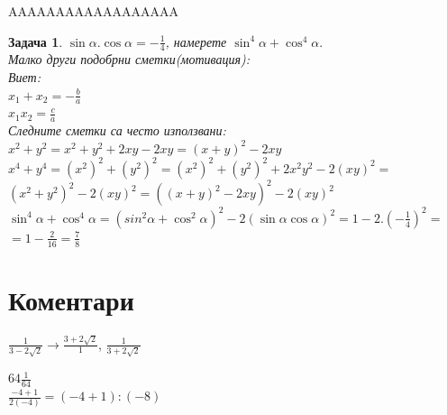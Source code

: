 \documentclass{article}
\newtheorem{problem}{Задача}
\begin{document}
AAAAAAAAAAAAAAAAAA \\

\begin{problem}
	$\sin \alpha . \cos \alpha = -\frac{1}{4}  $, намерете $\sin^4 \alpha + \cos^4 \alpha. $\\
	Малко други подобрни сметки(мотивация): \\
	Виет: \\
	$x_1 + x_2 = - \frac{b}{a} $\\
	$x_1 x_2 = \frac{c}{a} $\\
	Следните сметки са често използвани: \\
	$x^2 + y^2 = x^2 + y^2 +2xy - 2xy =  (x+y)^2 - 2xy $\\
	$x^4 + y^4 = (x^2)^2 +( y^2)^2 = (x^2)^2 +( y^2)^2 + 2x^2y^2 - 2(xy)^2 = $ \\
	$ (x^2 + y^2)^2 - 2(xy)^2  = ((x+y)^2 - 2xy)^2 - 2(xy)^2$ \\
	
	$\sin^4 \alpha + \cos^4 \alpha = (sin^2 \alpha + \cos^2 \alpha)^2 - 2(\sin \alpha \cos \alpha)^2 = 1 - 2.(-\frac{1}{4})^2 = $\\
	$= 1 - \frac{2}{16} = \frac{7}{8} $
	
\end{problem}

\section{Коментари}


$\frac{1}{3-2\sqrt2 } \to \frac{3+2\sqrt 2}{1} $, 
$\frac{1}{3+2\sqrt2 } $
\vspace{1cm}

$64\frac{1}{64} $\\
$\frac{-4+1}{2(-4)} = (-4+1):(-8) $
\end{document}
